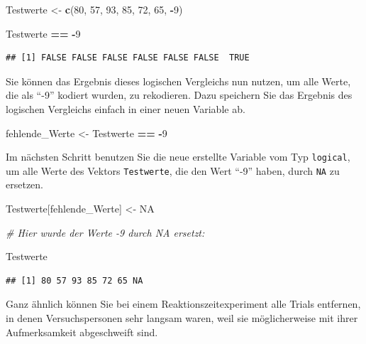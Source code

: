 \documentclass[
  ngerman,
]{book}
\newenvironment{Shaded}{\begin{snugshade}}{\end{snugshade}}
\newcommand{\CommentTok}[1]{\textcolor[rgb]{0.56,0.35,0.01}{\textit{#1}}}
\newcommand{\ConstantTok}[1]{\textcolor[rgb]{0.56,0.35,0.01}{#1}}
\newcommand{\DecValTok}[1]{\textcolor[rgb]{0.00,0.00,0.81}{#1}}
\newcommand{\FunctionTok}[1]{\textcolor[rgb]{0.13,0.29,0.53}{\textbf{#1}}}
\newcommand{\NormalTok}[1]{#1}
\newcommand{\OtherTok}[1]{\textcolor[rgb]{0.56,0.35,0.01}{#1}}
\newcommand{\SpecialCharTok}[1]{\textcolor[rgb]{0.81,0.36,0.00}{\textbf{#1}}}
\begin{document}
\begin{Shaded}
\begin{Highlighting}[]
\NormalTok{Testwerte }\OtherTok{\textless{}{-}} \FunctionTok{c}\NormalTok{(}\DecValTok{80}\NormalTok{, }\DecValTok{57}\NormalTok{, }\DecValTok{93}\NormalTok{, }\DecValTok{85}\NormalTok{, }\DecValTok{72}\NormalTok{, }\DecValTok{65}\NormalTok{, }\SpecialCharTok{{-}}\DecValTok{9}\NormalTok{)}

\NormalTok{Testwerte }\SpecialCharTok{==} \SpecialCharTok{{-}}\DecValTok{9}
\end{Highlighting}
\end{Shaded}

\begin{verbatim}
## [1] FALSE FALSE FALSE FALSE FALSE FALSE  TRUE
\end{verbatim}

Sie können das Ergebnis dieses logischen Vergleichs nun nutzen, um alle Werte, die als ``-9'' kodiert wurden, zu rekodieren. Dazu speichern Sie das Ergebnis des logischen Vergleichs einfach in einer neuen Variable ab.

\begin{Shaded}
\begin{Highlighting}[]
\NormalTok{fehlende\_Werte }\OtherTok{\textless{}{-}}\NormalTok{ Testwerte }\SpecialCharTok{==} \SpecialCharTok{{-}}\DecValTok{9}
\end{Highlighting}
\end{Shaded}

Im nächsten Schritt benutzen Sie die neue erstellte Variable vom Typ \texttt{logical}, um alle Werte des Vektors \texttt{Testwerte}, die den Wert ``-9'' haben, durch \texttt{NA} zu ersetzen.

\begin{Shaded}
\begin{Highlighting}[]
\NormalTok{Testwerte[fehlende\_Werte] }\OtherTok{\textless{}{-}} \ConstantTok{NA}

\CommentTok{\# Hier wurde der Werte {-}9 durch NA ersetzt:}

\NormalTok{Testwerte}
\end{Highlighting}
\end{Shaded}

\begin{verbatim}
## [1] 80 57 93 85 72 65 NA
\end{verbatim}

Ganz ähnlich können Sie bei einem Reaktionszeitexperiment alle Trials entfernen, in denen Versuchspersonen sehr langsam waren, weil sie möglicherweise mit ihrer Aufmerksamkeit abgeschweift sind.
\end{document}
